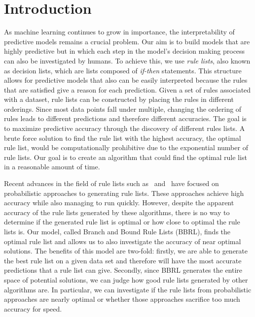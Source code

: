 \documentclass[aoas,preprint]{imsart}
\begin{document}
\section{Introduction}

As machine learning continues to grow in importance, the interpretability of
predictive models remains a crucial problem.
%
Our aim is to build models that are highly predictive but in which each step in
the model's decision making process can also be investigated by humans.
%
To achieve this, we use \emph{rule lists}, also known as decision lists, which
are lists composed of \emph{if-then} statements.
%
This structure allows for predictive models that also can be easily interpreted
because the rules that are satisfied give a reason for each prediction.
%
Given a set of rules associated with a dataset, rule lists can be constructed by
placing the rules in different orderings.
%
Since most data points fall under multiple, changing the ordering of rules leads
to different predictions and therefore different accuracies.
%
The goal is to maximize predictive accuracy through the discovery of different rules lists.
%
A brute force solution to find the rule list with the highest accuracy,
the optimal rule list, would be computationally prohibitive
due to the exponential number of rule lists.
%
Our goal is to create an algorithm that could find the optimal rule list
in a reasonable amount of time.

Recent advances in the field of rule lists such as~\citep{LethamRuMcMa15}
and~\citep{YangRuSe16} have focused on probabilistic approaches to generating rule lists.
%
These approaches achieve high accuracy while also managing to run quickly.
%
However, despite the apparent accuracy of the rule lists generated by these algorithms,
there is no way to determine if the generated rule list is optimal or
how close to optimal the rule lists is.
%
Our model, called Branch and Bound Rule Lists (BBRL), finds the optimal rule list
and allows us to also investigate the accuracy of near optimal solutions.
%
The benefits of this model are two-fold: firstly, we are able to generate
the best rule list on a given data set and therefore will have
the most accurate predictions that a rule list can give.
%
Secondly, since BBRL generates the entire space of potential solutions,
we can judge how good rule lists generated by other algorithms are.
%
In particular, we can investigate if the rule lists from probabilistic approaches
are nearly optimal or whether those approaches sacrifice too much accuracy for speed.
\end{document}

